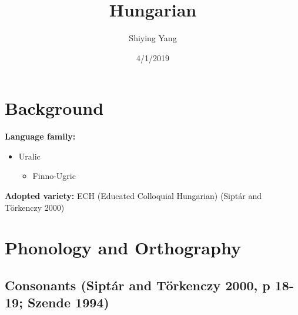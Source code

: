 \documentclass[12pt,]{article}
\title{Hungarian}
\author{Shiying Yang}
\date{4/1/2019}
\providecommand{\tightlist}{%
  \setlength{\itemsep}{0pt}\setlength{\parskip}{0pt}}
\begin{document}
\maketitle

\hypertarget{background}{%
\section{Background}\label{background}}

\textbf{Language family:}

\begin{itemize}
\tightlist
\item
  Uralic

  \begin{itemize}
  \tightlist
  \item
    Finno-Ugric
  \end{itemize}
\end{itemize}

\textbf{Adopted variety:} ECH (Educated Colloquial Hungarian) (Siptár
and Törkenczy 2000)

\hypertarget{phonology-and-orthography}{%
\section{Phonology and Orthography}\label{phonology-and-orthography}}

\hypertarget{con}{%
\subsection{\texorpdfstring{Consonants (Siptár and Törkenczy 2000, p
18-19; Szende
1994)}{Consonants , p 18-19(Siptár and Törkenczy 2000, p 18-19; Szende 1994)}}\label{con}}
\end{document}
